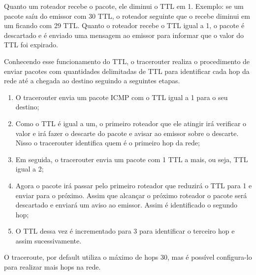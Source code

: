 \begin{enumerate}
    Quanto um roteador recebe o pacote, ele diminui o TTL em 1. Exemplo: se um pacote saíu do emissor
    com 30 TTL, o roteador seguinte que o recebe diminui em um ficando com 29 TTL. Quanto o roteador
    recebe o TTL igual a 1, o pacote é descartado e é enviado uma mensagem ao emissor para informar que
    o valor do TTL foi expirado.

    Conhecendo esse funcionamento do TTL, o tracerouter realiza o procedimento de enviar pacotes com quantidades
    delimitadas de TTL para identificar cada hop da rede até a chegada ao destino seguindo a seguintes etapas.
    \begin{enumerate}
      \item O tracerouter envia um pacote ICMP com o TTL igual a 1 para o seu destino;
      \item Como o TTL é igual a um, o primeiro roteador que ele atingir irá verificar o valor e irá fazer o
        descarte do pacote e avisar ao emissor sobre o descarte. Nisso o tracerouter identifica quem é o primeiro
        hop da rede;
      \item Em seguida, o tracerouter envia um pacote com 1 TTL a mais, ou seja, TTL igual a 2;
      \item Agora o pacote irá passar pelo primeiro roteador que reduzirá o TTL para 1 e enviar para o próximo.
        Assim que alcançar o próximo roteador o pacote será descartado e enviará um aviso ao emissor. Assim é identificado
        o segundo hop;
      \item O TTL dessa vez é incrementado para 3 para identificar o terceiro hop e assim sucessivamente.
    \end{enumerate}

    O traceroute, por default utiliza o máximo de hops 30, mas é possível configura-lo para realizar mais hops na rede.


\end{enumerate}
